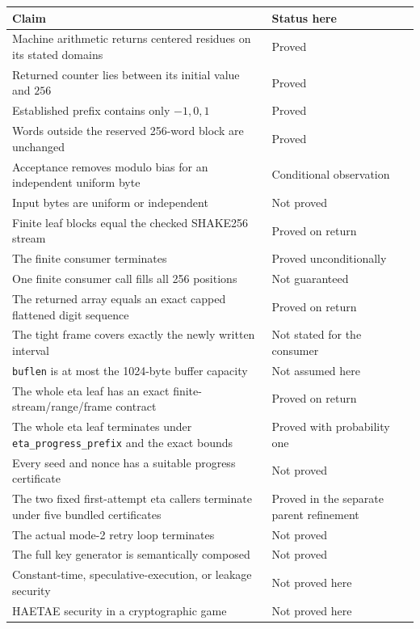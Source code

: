 \documentclass[11pt]{article}
\theoremstyle{definition}
\theoremstyle{plain}
\theoremstyle{remark}
\newcommand{\code}[1]{\nolinkurl{#1}}
\begin{document}
\begin{center}
\small
\begin{tabularx}{0.98\textwidth}{>{\raggedright\arraybackslash}p{}X}
\toprule
Claim & Status here \\
\midrule
Machine arithmetic returns centered residues on its stated domains & Proved \\
Returned counter lies between its initial value and $256$ & Proved \\
Established prefix contains only $-1,0,1$ & Proved \\
Words outside the reserved 256-word block are unchanged & Proved \\
Acceptance removes modulo bias for an independent uniform byte & Conditional observation \\
Input bytes are uniform or independent & Not proved \\
Finite leaf blocks equal the checked SHAKE256 stream & Proved on return \\
The finite consumer terminates & Proved unconditionally \\
One finite consumer call fills all 256 positions & Not guaranteed \\
The returned array equals an exact capped flattened digit sequence & Proved on return \\
The tight frame covers exactly the newly written interval & Not stated for the consumer \\
\code{buflen} is at most the 1024-byte buffer capacity & Not assumed here \\
The whole eta leaf has an exact finite-stream/range/frame contract & Proved on return \\
The whole eta leaf terminates under \code{eta_progress_prefix} and the exact bounds & Proved with probability one \\
Every seed and nonce has a suitable progress certificate & Not proved \\
The two fixed first-attempt eta callers terminate under five bundled
certificates & Proved in the separate parent refinement \\
The actual mode-2 retry loop terminates & Not proved \\
The full key generator is semantically composed & Not proved \\
Constant-time, speculative-execution, or leakage security & Not proved here \\
HAETAE security in a cryptographic game & Not proved here \\
\bottomrule
\end{tabularx}
\end{center}
\end{document}
